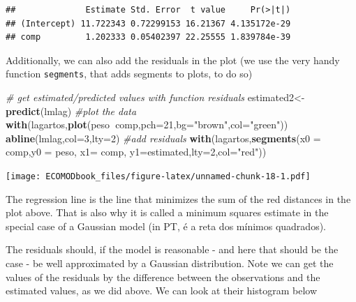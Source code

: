 \documentclass[
]{book}
\newenvironment{Shaded}{\begin{snugshade}}{\end{snugshade}}
\newcommand{\CommentTok}[1]{\textcolor[rgb]{0.56,0.35,0.01}{\textit{#1}}}
\newcommand{\DataTypeTok}[1]{\textcolor[rgb]{0.13,0.29,0.53}{#1}}
\newcommand{\DecValTok}[1]{\textcolor[rgb]{0.00,0.00,0.81}{#1}}
\newcommand{\KeywordTok}[1]{\textcolor[rgb]{0.13,0.29,0.53}{\textbf{#1}}}
\newcommand{\NormalTok}[1]{#1}
\newcommand{\OperatorTok}[1]{\textcolor[rgb]{0.81,0.36,0.00}{\textbf{#1}}}
\newcommand{\StringTok}[1]{\textcolor[rgb]{0.31,0.60,0.02}{#1}}
\begin{document}
\begin{Shaded}
\end{Shaded}

\begin{verbatim}
##              Estimate Std. Error  t value     Pr(>|t|)
## (Intercept) 11.722343 0.72299153 16.21367 4.135172e-29
## comp         1.202333 0.05402397 22.25555 1.839784e-39
\end{verbatim}

Additionally, we can also add the residuals in the plot (we use the very handy function \texttt{segments}, that adds segments to plots, to do so)

\begin{Shaded}
\begin{Highlighting}[]
\CommentTok{# get estimated/predicted values with function residuals}
\NormalTok{estimated2<-}\KeywordTok{predict}\NormalTok{(lmlag)}
\CommentTok{#plot the data}
\KeywordTok{with}\NormalTok{(lagartos,}\KeywordTok{plot}\NormalTok{(peso}\OperatorTok{~}\NormalTok{comp,}\DataTypeTok{pch=}\DecValTok{21}\NormalTok{,}\DataTypeTok{bg=}\StringTok{"brown"}\NormalTok{,}\DataTypeTok{col=}\StringTok{"green"}\NormalTok{))}
\KeywordTok{abline}\NormalTok{(lmlag,}\DataTypeTok{col=}\DecValTok{3}\NormalTok{,}\DataTypeTok{lty=}\DecValTok{2}\NormalTok{)}
\CommentTok{#add residuals}
\KeywordTok{with}\NormalTok{(lagartos,}\KeywordTok{segments}\NormalTok{(}\DataTypeTok{x0 =}\NormalTok{ comp,}\DataTypeTok{y0 =}\NormalTok{ peso, }\DataTypeTok{x1=}\NormalTok{ comp, }\DataTypeTok{y1=}\NormalTok{estimated,}\DataTypeTok{lty=}\DecValTok{2}\NormalTok{,}\DataTypeTok{col=}\StringTok{"red"}\NormalTok{))}
\end{Highlighting}
\end{Shaded}

\texttt{[image: ECOMODbook\_files/figure-latex/unnamed-chunk-18-1.pdf]}

The regression line is the line that minimizes the sum of the red distances in the plot above. That is also why it is called a minimum squares estimate in the special case of a Gaussian model (in PT, é a reta dos mínimos quadrados).

The residuals should, if the model is reasonable - and here that should be the case - be well approximated by a Gaussian distribution. Note we can get the values of the residuals by the difference between the observations and the estimated values, as we did above. We can look at their histogram below
\end{document}
